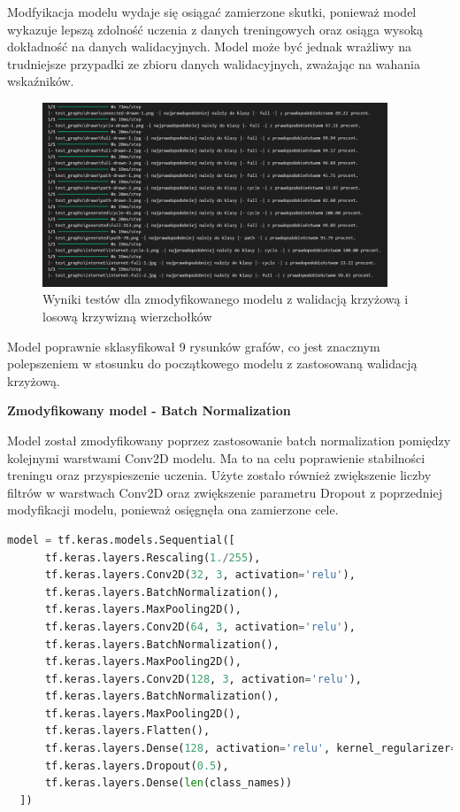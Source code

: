 Modfyikacja modelu wydaje się osiągać zamierzone skutki,
ponieważ model wykazuje lepszą zdolność uczenia z danych treningowych
oraz osiąga wysoką dokładność na danych walidacyjnych.
Model może być jednak wrażliwy na trudniejsze przypadki ze zbioru danych walidacyjnych,
zważając na wahania wskaźników.

\begin{figure}[ht]
	\centering
	\includegraphics[height=5.5cm]{resources/tests/images/v4/crossvalid_1_txt.png}
	\caption{Wyniki testów dla zmodyfikowanego modelu z walidacją krzyżową i losową krzywizną wierzchołków}
	\label{Fig:tests-cv-1}
\end{figure}
\FloatBarrier

Model poprawnie sklasyfikował 9 rysunków grafów,
co jest znacznym polepszeniem w stosunku do początkowego modelu z zastosowaną walidacją krzyżową.

\textbf{Zmodyfikowany model - Batch Normalization}

Model został zmodyfikowany poprzez zastosowanie batch normalization pomiędzy kolejnymi warstwami Conv2D modelu.
Ma to na celu poprawienie stabilności treningu oraz przyspieszenie uczenia.
Użyte zostało również zwiększenie liczby filtrów w warstwach Conv2D oraz zwiększenie parametru Dropout
z poprzedniej modyfikacji modelu, ponieważ osięgnęła ona zamierzone cele.

\begin{lstlisting}[language=Python,caption=Listing zmodyfikowanego skryptu tworzącego model z walidacją krzyżową,
	label={tests-model-crossval2}]
	model = tf.keras.models.Sequential([
      tf.keras.layers.Rescaling(1./255),
      tf.keras.layers.Conv2D(32, 3, activation='relu'),
      tf.keras.layers.BatchNormalization(),
      tf.keras.layers.MaxPooling2D(),
      tf.keras.layers.Conv2D(64, 3, activation='relu'),
      tf.keras.layers.BatchNormalization(),
      tf.keras.layers.MaxPooling2D(),
      tf.keras.layers.Conv2D(128, 3, activation='relu'),
      tf.keras.layers.BatchNormalization(),
      tf.keras.layers.MaxPooling2D(),
      tf.keras.layers.Flatten(),
      tf.keras.layers.Dense(128, activation='relu', kernel_regularizer=tf.keras.regularizers.l2(0.01)),
      tf.keras.layers.Dropout(0.5),
      tf.keras.layers.Dense(len(class_names))
  ])
\end{lstlisting}

